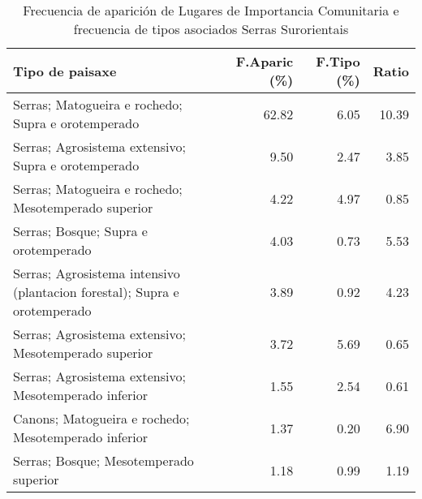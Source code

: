 \begin{table}[p]
\centering
\caption{Frecuencia de aparición de Lugares de Importancia Comunitaria e frecuencia de tipos asociados Serras Surorientais} 
\label{vnatura9}
\begin{tabular}{lrrr}
  \hline
Tipo de paisaxe & F.Aparic (\%) & F.Tipo (\%) & Ratio \\ 
  \hline
Serras; Matogueira e rochedo; Supra e orotemperado & 62.82 & 6.05 & 10.39 \\ 
  Serras; Agrosistema extensivo; Supra e orotemperado & 9.50 & 2.47 & 3.85 \\ 
  Serras; Matogueira e rochedo; Mesotemperado superior & 4.22 & 4.97 & 0.85 \\ 
  Serras; Bosque; Supra e orotemperado & 4.03 & 0.73 & 5.53 \\ 
  Serras; Agrosistema intensivo (plantacion forestal); Supra e orotemperado & 3.89 & 0.92 & 4.23 \\ 
  Serras; Agrosistema extensivo; Mesotemperado superior & 3.72 & 5.69 & 0.65 \\ 
  Serras; Agrosistema extensivo; Mesotemperado inferior & 1.55 & 2.54 & 0.61 \\ 
  Canons; Matogueira e rochedo; Mesotemperado inferior & 1.37 & 0.20 & 6.90 \\ 
  Serras; Bosque; Mesotemperado superior & 1.18 & 0.99 & 1.19 \\ 
   \hline
\end{tabular}
\end{table}
